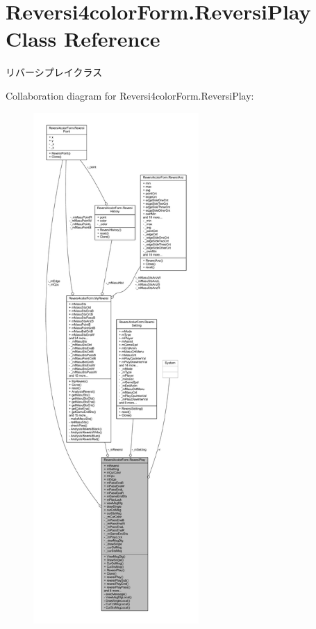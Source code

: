 \hypertarget{class_reversi4color_form_1_1_reversi_play}{}\section{Reversi4color\+Form.\+Reversi\+Play Class Reference}
\label{class_reversi4color_form_1_1_reversi_play}


リバーシプレイクラス  




Collaboration diagram for Reversi4color\+Form.\+Reversi\+Play\+:\nopagebreak
\begin{figure}[H]
\begin{center}
\leavevmode
\includegraphics[height=550pt]{class_reversi4color_form_1_1_reversi_play__coll__graph}
\end{center}
\end{figure}

